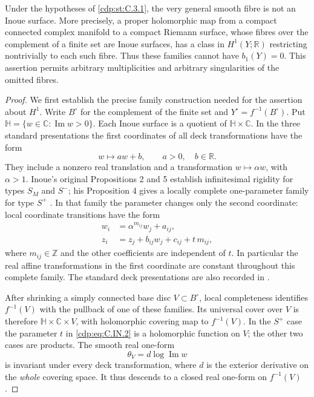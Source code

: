 
\begin{proposition}\label{cdp:st:C.3.12}

Under the hypotheses of \ref{cdp:st:C.3.1}, the very general smooth fibre is
not an Inoue surface. More precisely, a proper holomorphic map from
a compact connected complex manifold to a compact Riemann surface,
whose fibres over the complement of a finite set are Inoue surfaces,
has a class in $H^1(Y;\mathbb R)$ restricting nontrivially to each
such fibre. Thus these families cannot have $b_1(Y)=0$.
This assertion permits arbitrary multiplicities and arbitrary
singularities of the omitted fibres.
\end{proposition}
\begin{proof}
We first establish the precise family construction needed for the
assertion about $H^1$. Write $B^\circ$ for the complement of the
finite set and $Y^\circ=f^{-1}(B^\circ)$. Put
$\mathbb H=\{w\in\mathbb C:\operatorname{Im}w>0\}$.
Each Inoue surface is a quotient of $\mathbb H\times\mathbb C$.
In the three standard presentations the first coordinates of all
deck transformations have the form
\[
 w\longmapsto a w+b,\qquad a>0,\quad b\in\mathbb R.
\tag{C.IN.1}\label{cdp:eq:C.IN.1}
\]
They include a nonzero real translation and a transformation
$w\mapsto\alpha w$, with $\alpha>1$. Inoue's original
Propositions 2 and 5 establish infinitesimal rigidity for types
$S_M$ and $S^{-}$; his Proposition 4 gives a locally complete
one-parameter family for type $S^{+}$
\cite[pp.~274, 278, 280]{Inoue1974}.
In that family the parameter changes only the second coordinate:
local coordinate transitions have the form
\[
\begin{aligned}
 w_i&=\alpha^{m_{ij}}w_j+a_{ij},\\
 z_i&=z_j+b_{ij}w_j+c_{ij}+t\,m_{ij},
\end{aligned}
\tag{C.IN.2}\label{cdp:eq:C.IN.2}
\]
where $m_{ij}\in\mathbb Z$ and the other coefficients are
independent of $t$. In particular the real affine transformations
in the first coordinate are constant throughout this complete
family. The standard deck presentations are also recorded in
\cite[Sections 2.1--2.3]{KhaledTeleman2026}.

After shrinking a simply connected base disc $V\subset B^\circ$,
local completeness identifies $f^{-1}(V)$ with the pullback of one
of these families. Its universal cover over $V$ is therefore
$\mathbb H\times\mathbb C\times V$, with holomorphic covering
map to $f^{-1}(V)$. In the $S^{+}$ case the parameter $t$ in
\eqref{cdp:eq:C.IN.2} is a holomorphic function on $V$; the other two cases
are products. The smooth real one-form
\[
 \theta_V=d\log\operatorname{Im}w
\tag{C.IN.3}\label{cdp:eq:C.IN.3}
\]
is invariant under every deck transformation, where $d$ is the
exterior derivative on the \emph{whole} covering space. It thus
descends to a closed real one-form on $f^{-1}(V)$.


\end{proof}
